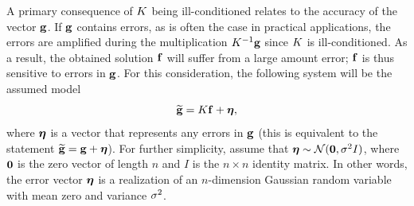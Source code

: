 A primary consequence of $K$ being ill-conditioned relates to the accuracy of the vector $\mathbf{g}$. If $\mathbf{g}$ contains errors, as is often the case in practical applications, the errors are amplified during the multiplication $K^{-1}\mathbf{g}$ since $K$ is ill-conditioned. As a result, the obtained solution $\mathbf{f}$ will suffer from a large amount error; $\mathbf{f}$ is thus sensitive to errors in $\mathbf{g}$. For this consideration, the following system will be the assumed model
\begin{equation}
\widetilde{\mathbf{g}} = K\mathbf{f} + \boldsymbol{\eta},
\label{eq:DisNoise}
\end{equation}
where $\boldsymbol{\eta}$ is a vector that represents any errors in $\mathbf{g}$ (this is equivalent to the statement $\widetilde{\mathbf{g}} = \mathbf{g} + \boldsymbol{\eta}$). For further simplicity, assume that $\boldsymbol{\eta} \sim \mathcal{N}(\boldsymbol{0},\sigma^2I)$, where $\boldsymbol{0}$ is the zero vector of length $n$ and $I$ is the $n \times n$ identity matrix. In other words, the error vector $\boldsymbol{\eta}$ is a realization of an $n$-dimension Gaussian random variable with mean zero and variance $\sigma^2$. 

